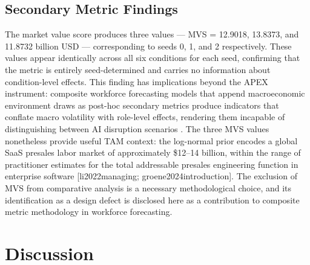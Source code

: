 \documentclass[10pt, conference]{IEEEtran}
\begin{document}
{\subsection{Secondary Metric Findings}

\label{sec:secondary_metric_findings}

The market value score produces three values --- MVS = 12.9018, 13.8373, and 11.8732 billion USD --- corresponding to seeds 0, 1, and 2 respectively. These values appear identically across all six conditions for each seed, confirming that the metric is entirely seed-determined and carries no information about condition-level effects. This finding has implications beyond the APEX instrument: composite workforce forecasting models that append macroeconomic environment draws as post-hoc secondary metrics produce indicators that conflate macro volatility with role-level effects, rendering them incapable of distinguishing between AI disruption scenarios \cite{virtanen2020scipy}. The three MVS values nonetheless provide useful TAM context: the log-normal prior encodes a global SaaS presales labor market of approximately \$12--14 billion, within the range of practitioner estimates for the total addressable presales engineering function in enterprise software [li2022managing; groene2024introduction]. The exclusion of MVS from comparative analysis is a necessary methodological choice, and its identification as a design defect is disclosed here as a contribution to composite metric methodology in workforce forecasting.

\section{Discussion}

\label{sec:discussion}

}
\end{document}
